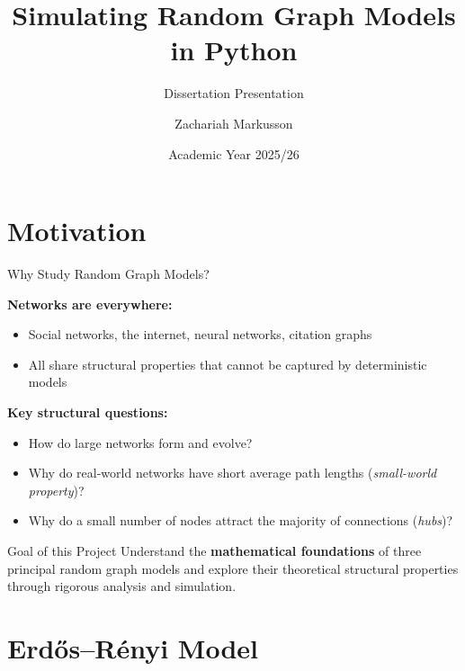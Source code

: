 \documentclass[t]{beamer}
\title[Random Graph Models]{Simulating Random Graph Models in Python}
\subtitle{Dissertation Presentation}
\author{Zachariah Markusson}
\institute[Swansea University]{Department of Mathematics\\
Swansea University}
\date{Academic Year 2025/26}
\begin{document}
\begin{frame}
  \titlepage
\end{frame}

\section{Motivation}

\begin{frame}{Why Study Random Graph Models?}

\textbf{Networks are everywhere:}
\begin{itemize}
  \item Social networks, the internet, neural networks, citation graphs
  \item All share structural properties that cannot be captured by deterministic models
\end{itemize}

\medskip

\textbf{Key structural questions:}
\begin{itemize}
  \item How do large networks form and evolve?
  \item Why do real-world networks have short average path lengths (\emph{small-world property})?
  \item Why do a small number of nodes attract the majority of connections (\emph{hubs})?
\end{itemize}

\medskip

\begin{block}{Goal of this Project}
  Understand the \textbf{mathematical foundations} of three principal random graph models
  and explore their theoretical structural properties through rigorous analysis and simulation.
\end{block}

\end{frame}

\section{Erd\H{o}s--R\'{e}nyi Model}
\end{document}
